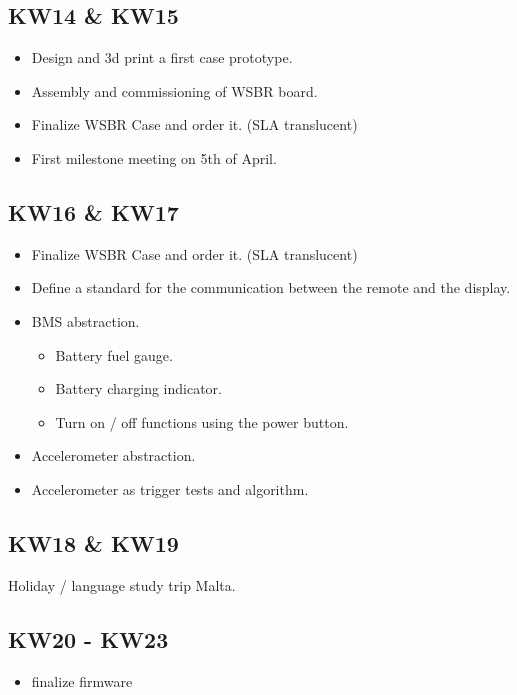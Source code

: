 \subsection{KW14 \& KW15}
\label{ssec:KW14_KW15}
\begin{itemize}
    \item Design and 3d print a first case prototype.
    \item Assembly and commissioning of WSBR board.
    \item Finalize WSBR Case and order it. (SLA translucent)
    \item First milestone meeting on 5th of April.
\end{itemize}


\subsection{KW16 \& KW17}
\label{ssec:KW16_KW17}
\begin{itemize}
    \item Finalize WSBR Case and order it. (SLA translucent)
    \item Define a standard for the communication between the remote and the display.
    \item BMS abstraction.
    \begin{itemize}
        \item Battery fuel gauge.
        \item Battery charging indicator.
        \item Turn on / off functions using the power button.
    \end{itemize}
    \item Accelerometer abstraction.
    \item Accelerometer as trigger tests and algorithm.
\end{itemize}


\subsection{KW18 \& KW19}
\label{ssec:KW18_KW19}
Holiday / language study trip Malta.


\subsection{KW20 - KW23}
\label{ssec:KW20_KW21}
\begin{itemize}
    \item finalize firmware
\end{itemize}


